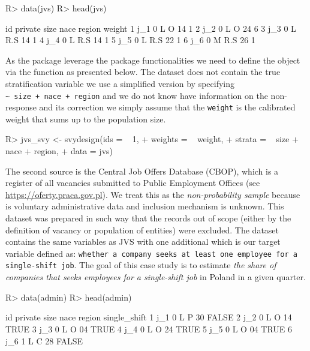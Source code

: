 \documentclass[
]{jss}
\begin{document}
\begin{CodeChunk}
\begin{CodeInput}
R> data(jvs)
R> head(jvs)
\end{CodeInput}
\begin{CodeOutput}
   id private size nace region weight
1 j_1       0    L    O     14      1
2 j_2       0    L    O     24      6
3 j_3       0    L  R.S     14      1
4 j_4       0    L  R.S     14      1
5 j_5       0    L  R.S     22      1
6 j_6       0    M  R.S     26      1
\end{CodeOutput}
\end{CodeChunk}

As the package leverage the  package functionalities we need
to define the  object via the  function
as presented below. The dataset does not contain the true stratification
variable we use a simplified version by specifying
\texttt{\textasciitilde{}\ size\ +\ nace\ +\ region} and we do not know
have information on the non-response and its correction we simply assume
that the \texttt{weight} is the calibrated weight that sums up to the
population size.

\begin{CodeChunk}
\begin{CodeInput}
R> jvs_svy <- svydesign(ids = ~ 1, 
+                      weights = ~ weight,
+                      strata = ~ size + nace + region,
+                      data = jvs)
\end{CodeInput}
\end{CodeChunk}

The second source is the Central Job Offers Database (CBOP), which is a
register of all vacancies submitted to Public Employment Offices (see
\url{https://oferty.praca.gov.pl}). We treat this as the
\textit{non-probability sample} because is voluntary administrative data
and inclusion mechanism is unknown. This dataset was prepared in such
way that the records out of scope (either by the definition of vacancy
or population of entities) were excluded. The dataset contains the same
variables as JVS with one additional  which is our
target variable defined as:
\texttt{whether a company seeks at least one employee for a single-shift job}.
The goal of this case study is to estimate
\textit{the share of companies that seeks employees for a single-shift job}
in Poland in a given quarter.

\begin{CodeChunk}
\begin{CodeInput}
R> data(admin)
R> head(admin)
\end{CodeInput}
\begin{CodeOutput}
   id private size nace region single_shift
1 j_1       0    L    P     30        FALSE
2 j_2       0    L    O     14         TRUE
3 j_3       0    L    O     04         TRUE
4 j_4       0    L    O     24         TRUE
5 j_5       0    L    O     04         TRUE
6 j_6       1    L    C     28        FALSE
\end{CodeOutput}
\end{CodeChunk}
\end{document}
